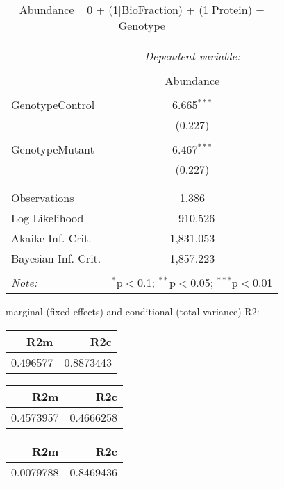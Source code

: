 \documentclass[11pt]{report}
\begin{document}
\begin{table}[!htbp] \centering 
  \caption{Abundance ~ 0 + (1|BioFraction) + (1|Protein) + Genotype} 
  \label{} 
\begin{tabular}{@{\extracolsep{5pt}}lc} 
\\[-1.8ex]\hline 
\hline \\[-1.8ex] 
 & \multicolumn{1}{c}{\textit{Dependent variable:}} \\ 
\cline{2-2} 
\\[-1.8ex] & Abundance \\ 
\hline \\[-1.8ex] 
 GenotypeControl & 6.665$^{***}$ \\ 
  & (0.227) \\ 
  & \\ 
 GenotypeMutant & 6.467$^{***}$ \\ 
  & (0.227) \\ 
  & \\ 
\hline \\[-1.8ex] 
Observations & 1,386 \\ 
Log Likelihood & $-$910.526 \\ 
Akaike Inf. Crit. & 1,831.053 \\ 
Bayesian Inf. Crit. & 1,857.223 \\ 
\hline 
\hline \\[-1.8ex] 
\textit{Note:}  & \multicolumn{1}{r}{$^{*}$p$<$0.1; $^{**}$p$<$0.05; $^{***}$p$<$0.01} \\ 
\end{tabular} 
\end{table} 
marginal (fixed effects) and conditional (total variance) R2:

\begin{tabular}{r|r}
\hline
R2m & R2c\\
\hline
0.496577 & 0.8873443\\
\hline
\end{tabular}

\begin{tabular}{r|r}
\hline
R2m & R2c\\
\hline
0.4573957 & 0.4666258\\
\hline
\end{tabular}

\begin{tabular}{r|r}
\hline
R2m & R2c\\
\hline
0.0079788 & 0.8469436\\
\hline
\end{tabular}
\end{document}
